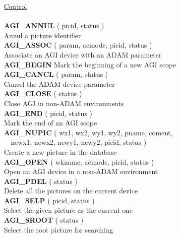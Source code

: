 \begin{tabbing}
\underline{Control}\\ \\
{\bf AGI\_ANNUL} \> ( picid, status )\\
                 \> Annul a picture identifier\\[1ex]
{\bf AGI\_ASSOC} \> ( param, acmode, picid, status )\\
                 \> Associate an AGI device with an ADAM parameter\\[1ex]
{\bf AGI\_BEGIN} \> Mark the beginning of a new AGI scope\\[1ex]
{\bf AGI\_CANCL} \> ( param, status )\\
                 \> Cancel the ADAM device parameter\\[1ex]
{\bf AGI\_CLOSE} \> ( status )\\
                 \> Close AGI in non-ADAM environments\\[1ex]
{\bf AGI\_END}   \> ( picid, status )\\
                 \> Mark the end of an AGI scope\\[1ex]
{\bf AGI\_NUPIC} \> ( wx1, wx2, wy1, wy2, pname, coment,\\
                 \> ~~newx1, newx2, newy1, newy2, picid, status )\\
                 \> Create a new picture in the database\\[1ex]
{\bf AGI\_OPEN}  \> ( wkname, acmode, picid, status )\\
                 \> Open an AGI device in a non-ADAM environment\\[1ex]
{\bf AGI\_PDEL}  \> ( status )\\
                 \> Delete all the pictures on the current device\\[1ex]
{\bf AGI\_SELP}  \> ( picid, status )\\
                 \> Select the given picture as the current one\\[1ex]
{\bf AGI\_SROOT} \> ( status )\\
                 \> Select the root picture for searching\\[2ex]


\end{tabbing}
